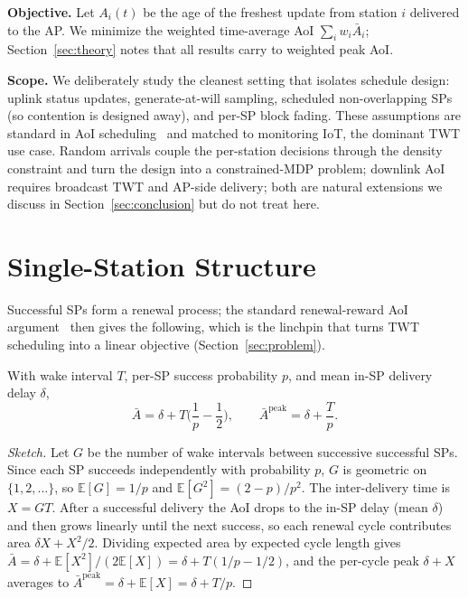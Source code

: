 \textbf{Objective.} Let $A_i(t)$ be the age of the freshest update from
station $i$ delivered to the AP. We minimize the weighted time-average AoI
$\sum_i w_i \bar A_i$; Section~\ref{sec:theory} notes that all results carry
to weighted peak AoI.

\textbf{Scope.} We deliberately study the cleanest setting that isolates
schedule design: uplink status updates, generate-at-will sampling, scheduled
non-overlapping SPs (so contention is designed away), and per-SP block
fading. These assumptions are standard in AoI scheduling~\cite{kadota18,
gamgam23} and matched to monitoring IoT, the dominant TWT use case. Random
arrivals couple the per-station decisions through the density constraint and
turn the design into a constrained-MDP problem; downlink AoI requires
broadcast TWT and AP-side delivery; both are natural extensions we discuss
in Section~\ref{sec:conclusion} but do not treat here.

\section{Single-Station Structure}
\label{sec:single}

Successful SPs form a renewal process; the standard renewal-reward AoI
argument~\cite{kaul12,yates21} then gives the following, which is the linchpin
that turns TWT scheduling into a linear objective (Section~\ref{sec:problem}).

\begin{proposition}
\label{prop:renewal}
With wake interval $T$, per-SP success probability $p$, and mean in-SP
delivery delay $\delta$,
\[
\bar A = \delta + T\Big(\frac{1}{p} - \frac12\Big), \qquad
\bar A^{\mathrm{peak}} = \delta + \frac{T}{p}.
\]
\end{proposition}

\begin{proof}[Sketch]
Let $G$ be the number of wake intervals between successive successful SPs.
Since each SP succeeds independently with probability $p$, $G$ is geometric on
$\{1,2,\dots\}$, so $\mathbb{E}[G] = 1/p$ and $\mathbb{E}[G^2] = (2-p)/p^2$.
The inter-delivery time is $X = GT$. After a successful delivery the AoI drops
to the in-SP delay (mean $\delta$) and then grows linearly until the next
success, so each renewal cycle contributes area $\delta X + X^2/2$. Dividing
expected area by expected cycle length gives
$\bar A = \delta + \mathbb{E}[X^2]/(2\mathbb{E}[X]) = \delta + T(1/p - 1/2)$,
and the per-cycle peak $\delta + X$ averages to
$\bar A^{\mathrm{peak}} = \delta + \mathbb{E}[X] = \delta + T/p$.
\end{proof}

